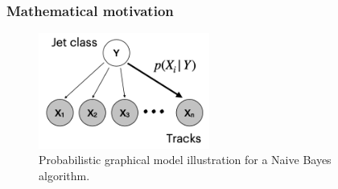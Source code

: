 \subsubsection{Mathematical motivation}


\begin{figure}[htbp]
  \centering
 \includegraphics[width=0.5\textwidth]{figures/ftag/Naive-Bayes-illustration}
 \caption{Probabilistic graphical model illustration for a Naive Bayes algorithm.  }
  \label{fig:Naive-Bayes-illustration}
\end{figure}


\begin{figure}[htbp]
  \centering
  \caption{ \cite{ATL-PHYS-PUB-2017-003}}
  \label{fig:rnnip-note-trk-ind}
\end{figure}



